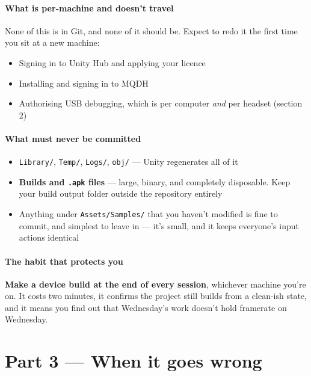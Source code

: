 \documentclass[11pt,a4paper]{article}
\providecommand{\tightlist}{\setlength{\itemsep}{2pt}\setlength{\parskip}{0pt}}
\begin{document}
\subsection{What is per-machine and doesn't travel}\label{what-is-per-machine-and-doesnt-travel}

None of this is in Git, and none of it should be. Expect to redo it the first time you sit
at a new machine:

\begin{itemize}
\tightlist
\item
  Signing in to Unity Hub and applying your licence
\item
  Installing and signing in to MQDH
\item
  Authorising USB debugging, which is per computer \emph{and} per headset (section 2)
\end{itemize}

\subsection{What must never be committed}\label{what-must-never-be-committed}

\begin{itemize}
\tightlist
\item
  \texttt{Library/}, \texttt{Temp/}, \texttt{Logs/}, \texttt{obj/} --- Unity regenerates all of it
\item
  \textbf{Builds and \texttt{.apk} files} --- large, binary, and completely disposable. Keep your build
  output folder outside the repository entirely
\item
  Anything under \texttt{Assets/Samples/} that you haven't modified is fine to commit, and
  simplest to leave in --- it's small, and it keeps everyone's input actions identical
\end{itemize}

\subsection{The habit that protects you}\label{the-habit-that-protects-you}

\textbf{Make a device build at the end of every session}, whichever machine you're on. It costs
two minutes, it confirms the project still builds from a clean-ish state, and it means you
find out that Wednesday's work doesn't hold framerate on Wednesday.


\clearpage
\part*{Part 3 --- When it goes wrong}
\end{document}
